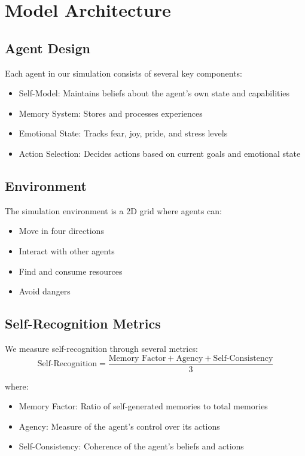 \documentclass[conference]{IEEEtran}
\begin{document}
\section{Model Architecture}
\subsection{Agent Design}
Each agent in our simulation consists of several key components:

\begin{itemize}
    \item Self-Model: Maintains beliefs about the agent's own state and capabilities
    \item Memory System: Stores and processes experiences
    \item Emotional State: Tracks fear, joy, pride, and stress levels
    \item Action Selection: Decides actions based on current goals and emotional state
\end{itemize}

\subsection{Environment}
The simulation environment is a 2D grid where agents can:
\begin{itemize}
    \item Move in four directions
    \item Interact with other agents
    \item Find and consume resources
    \item Avoid dangers
\end{itemize}

\subsection{Self-Recognition Metrics}
We measure self-recognition through several metrics:
\begin{equation}
    \text{Self-Recognition} = \frac{\text{Memory Factor} + \text{Agency} + \text{Self-Consistency}}{3}
\end{equation}

where:
\begin{itemize}
    \item Memory Factor: Ratio of self-generated memories to total memories
    \item Agency: Measure of the agent's control over its actions
    \item Self-Consistency: Coherence of the agent's beliefs and actions
\end{itemize}
\end{document}

